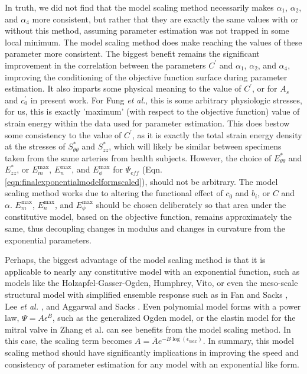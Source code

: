 	In truth, we did not find that the model scaling method necessarily makes $\alpha_1$, $\alpha_2$, and $\alpha_4$ more consistent, but rather that they are exactly the same values with or without this method, assuming parameter estimation was not trapped in some local minimum. The model scaling method does make reaching the values of these parameter more consistent. The biggest benefit remains the significant improvement in the correlation between the parameters $C^\prime$ and $\alpha_1$, $\alpha_2$, and $\alpha_4$, improving the conditioning of the objective function surface during parameter estimation. It also imparts some physical meaning to the value of $C^\prime$, or for $A_s$ and $c_0^\prime$ in present work. For Fung \textit{et al.}, this is some arbitrary physiologic stresses, for us, this is exactly 'maximum' (with respect to the objective function) value of strain energy within the data used for parameter estimation. This does bestow some consistency to the value of $C^\prime$, as it is exactly the total strain energy density at the stresses of $S_{\theta\theta}^*$ and $S_{zz}^*$, which will likely be similar between specimens taken from the same arteries from health subjects. However, the choice of $E_{\theta\theta}^*$ and $E_{zz}^*$, or $E_m^\mathrm{max}$, $E_n^\mathrm{max}$, and $E_\phi^\mathrm{max}$ for $\Psi_{eff}$ (Eqn. \ref{eqn:finalexponentialmodelformscaled}), should not be arbitrary. The model scaling method works due to altering the functional effect of $c_0$ and $b_i$, or $C$ and $\alpha$. $E_m^\mathrm{max}$, $E_n^\mathrm{max}$, and $E_\phi^\mathrm{max}$ should be chosen deliberately so that area under the constitutive model, based on the objective function, remains approximately the same, thus decoupling changes in modulus and changes in curvature from the exponential parameters. 


	Perhaps, the biggest advantage of the model scaling method is that it is applicable to nearly any constitutive model with an exponential function, such as models like the Holzapfel-Gasser-Ogden, Humphrey, Vito, or even the meso-scale structural model with simplified ensemble response such as in Fan and Sacks \cite{fan_simulation_2014}, Lee \textit{et al.} \cite{lee_effects_2015}, and Aggarwal and Sacks \cite{aggarwal_inverse_2015}. Even polynomial model forms with a power law, $\Psi=A\epsilon^B$, such as the generalized Ogden model, or the elastin model for the mitral valve in Zhang et al. \cite{zhang_meso_2016} can see benefits from the model scaling method. In this case, the scaling term becomes $A = \bar{A} e^{-B \log(\epsilon_{max})}$. In summary, this model scaling method should have significantly implications in improving the speed and consistency of parameter estimation for any model with an exponential like form.
    
